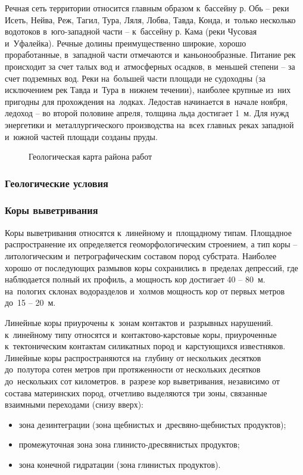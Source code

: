 Речная сеть территории относится главным образом к~бассейну р. Обь  --  реки Исеть, Нейва, Реж, Тагил, Тура, Ляля, Лобва, Тавда, Конда, и~только несколько водотоков в~юго-западной части  --  к~бассейну р. Кама (реки Чусовая и~Уфалейка). Речные долины преимущественно широкие, хорошо проработанные, в~западной части отмечаются и~каньонообразные. Питание рек происходит за счет талых вод и~атмосферных осадков, в~меньшей степени  --  за счет подземных вод. Реки на~большей части площади не судоходны (за исключением рек Тавда и~Тура в~нижнем течении), наиболее крупные из~них пригодны для прохождения на~лодках. Ледостав начинается в~начале ноября, ледоход  --  во второй половине апреля, толщина льда достигает 1~м. Для нужд энергетики и~металлургического производства на~всех
главных реках западной и~южной частей площади созданы пруды.

\begin{figure}[h]
	\centering
	\caption{Геологическая карта района работ}
\end{figure}

\subsubsection{Геологические условия}
\txtGeology

\subsubsection*{Коры выветривания}
Коры выветривания относятся к~линейному и~площадному типам. Площадное распространение их определяется геоморфологическим строением, а тип коры  --  литологическим и~петрографическим составом пород субстрата. Наиболее хорошо от последующих размывов коры сохранились в~пределах депрессий, где наблюдается полный их профиль, а  мощность кор достигает 40  --  80~м. на~пологих склонах водоразделов и~холмов мощность кор от первых метров до~15 -- 20~м.

Линейные коры приурочены к~зонам контактов и~разрывных нарушений. к~линейному типу относятся и~контактово-карстовые коры, приуроченные к~тектоническим контактам силикатных пород и~карстующихся
известняков. Линейные коры распространяются на~глубину от нескольких десятков до~полутора сотен метров при протяженности от нескольких десятков до~нескольких сот километров. в~разрезе кор выветривания, независимо от состава материнских пород, отчетливо выделяются три зоны, связанные взаимными переходами (снизу вверх): 
\begin{itemize}
\item зона дезинтеграции (зона щебнистых и~дресвяно-щебнистых продуктов);
\item промежуточная зона зона глинисто-дресвянистых продуктов;
\item зона конечной гидратации (зона глинистых продуктов).
\end{itemize}


